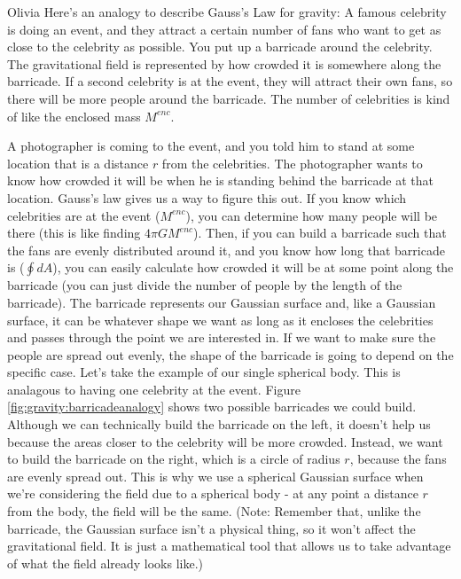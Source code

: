 \begin{studentOpinion}{Olivia} Here's an analogy to describe Gauss's Law for gravity: A famous celebrity is doing an event, and they attract a certain number of fans who want to get as close to the celebrity as possible. You put up a barricade around the celebrity. The gravitational field is represented by how crowded it is somewhere along the barricade. If a second celebrity is at the event, they will attract their own fans, so there will be more people around the barricade. The number of celebrities is kind of like the enclosed mass $M^{enc}$. 

A photographer is coming to the event, and you told him to stand at some location that is a distance $r$ from the celebrities. The photographer wants to know how crowded it will be when he is standing behind the barricade at that location. Gauss's law gives us a way to figure this out. If you know which celebrities are at the event ($M^{enc}$), you can determine how many people will be there (this is like finding $4\pi GM^{enc}$). Then, if you can build a barricade such that the fans are evenly distributed around it, and you know how long that barricade is ($\oint dA$), you can easily calculate how crowded it will be at some point along the barricade (you can just divide the number of people by the length of the barricade). 
\newpage
The barricade represents our Gaussian surface and, like a Gaussian surface, it can be whatever shape we want as long as it encloses the celebrities and passes through the point we are interested in. If we want to make sure the people are spread out evenly, the shape of the barricade is going to depend on the specific case. Let's take the example of our single spherical body. This is analagous to having one celebrity at the event. Figure \ref{fig:gravity:barricadeanalogy} shows two possible barricades we could build. Although we can technically build the barricade on the left, it doesn't help us because the areas closer to the celebrity will be more crowded. Instead, we want to build the barricade on the right, which is a circle of radius $r$, because the fans are evenly spread out. This is why we use a spherical Gaussian surface when we're considering the field due to a spherical body - at any point a distance $r$ from the body, the field will be the same. (Note: Remember that, unlike the barricade, the Gaussian surface isn't a physical thing, so it won't affect the gravitational field. It is just a mathematical tool that allows us to take advantage of what the field already looks like.)
\end{studentOpinion}

